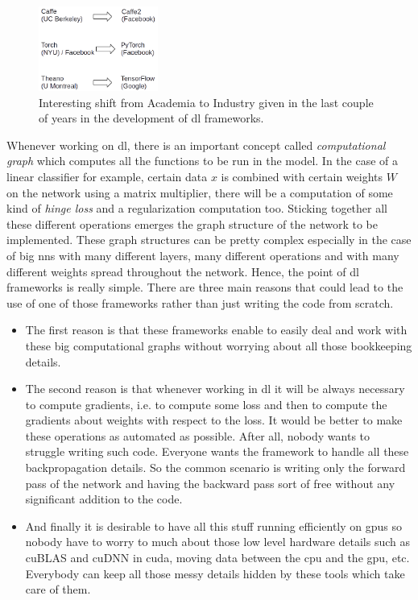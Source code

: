 \documentclass[11pt,a4paper]{article}
\begin{document}
\begin{figure}[h!]
    \centering
    \includegraphics[width=0.35\textwidth]{ML_Frameworks.png}
    \caption{Interesting shift from Academia to Industry given in the last couple of years in the development of \gls{dl} frameworks.}
    \label{fig:ML_Frameworks}
\end{figure}

Whenever working on \gls{dl}, there is an important concept called \emph{computational graph} which computes all the functions to be run in the model. In the case of a linear classifier for example, certain data $x$ is combined with certain weights $W$ on the network using a matrix multiplier, there will be a computation of some kind of \emph{hinge loss} and a regularization computation too. Sticking together all these different operations emerges the graph structure of the network to be implemented. These graph structures can be pretty complex especially in the case of big \glspl{nn} with many different layers, many different operations and with many different weights spread throughout the network. Hence, the point of \gls{dl} frameworks is really simple. There are three main reasons that could lead to the use of one of those frameworks rather than just writing the code from scratch. 

\begin{itemize}
	\item The first reason is that these frameworks enable to easily deal and work with these big computational graphs without worrying about all those bookkeeping details.
	\item The second reason is that whenever working in \gls{dl} it will be always necessary to compute gradients, i.e. to compute some loss and then to compute the gradients about weights with respect to the loss. It would be better to make these operations as automated as possible. After all, nobody wants to struggle writing such code. Everyone wants the framework to handle all these backpropagation details. So the common scenario is writing only the forward pass of the network and having the backward pass sort of free without any significant addition to the code.
	\item And finally it is desirable to have all this stuff running efficiently on \glspl{gpu} so nobody have to worry to much about those low level hardware details such as cuBLAS and cuDNN in \gls{cuda}, moving data between the \gls{cpu} and the \gls{gpu}, etc. Everybody can keep all those messy details hidden by these tools which take care of them.
\end{itemize}
\end{document}
